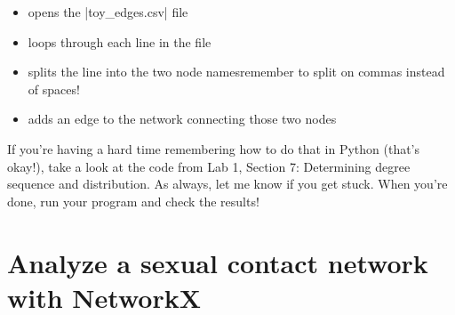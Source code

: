 \documentclass{article}
\begin{document}
\begin{itemize}
\item opens the |toy_edges.csv| file
\item loops through each line in the file
\item splits the line into the two node names\textemdash remember to split on commas instead of spaces!
\item adds an edge to the network connecting those two nodes
\end{itemize}

If you're having a hard time remembering how to do that in Python (that's okay!), take a look at the code from Lab 1, Section 7: Determining degree
 sequence and distribution.  As always, let me know if you get stuck.  When you're done, run your program and check the results!

\pagebreak

\section{Analyze a sexual contact network with NetworkX}
\end{document}
